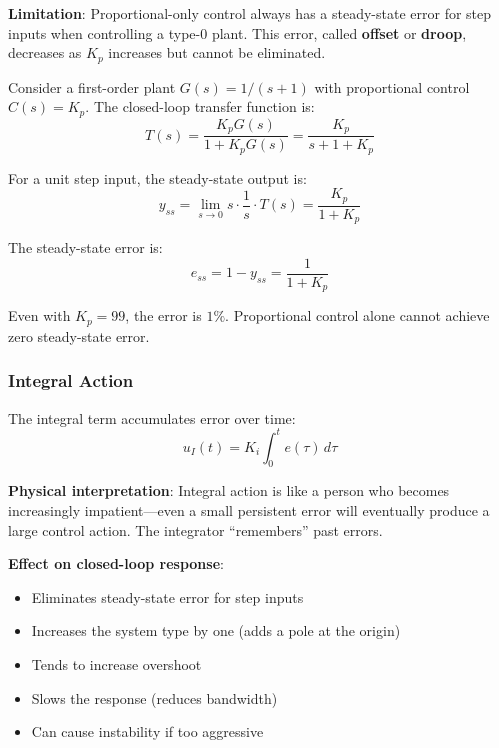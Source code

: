 \textbf{Limitation}: Proportional-only control always has a steady-state error for step inputs when controlling a type-0 plant. This error, called \textbf{offset} or \textbf{droop}, decreases as $K_p$ increases but cannot be eliminated.

\begin{example}
\label{ex:p_control_offset}
Consider a first-order plant $G(s) = 1/(s+1)$ with proportional control $C(s) = K_p$. The closed-loop transfer function is:
\begin{equation}
T(s) = \frac{K_p G(s)}{1 + K_p G(s)} = \frac{K_p}{s + 1 + K_p}
\end{equation}

For a unit step input, the steady-state output is:
\begin{equation}
y_{ss} = \lim_{s \to 0} s \cdot \frac{1}{s} \cdot T(s) = \frac{K_p}{1 + K_p}
\end{equation}

The steady-state error is:
\begin{equation}
e_{ss} = 1 - y_{ss} = \frac{1}{1 + K_p}
\end{equation}

Even with $K_p = 99$, the error is $1\%$. Proportional control alone cannot achieve zero steady-state error.
\end{example}

\subsubsection{Integral Action}

The integral term accumulates error over time:
\begin{equation}
u_I(t) = K_i \int_0^t e(\tau) \, d\tau
\end{equation}

\textbf{Physical interpretation}: Integral action is like a person who becomes increasingly impatient---even a small persistent error will eventually produce a large control action. The integrator ``remembers'' past errors.

\textbf{Effect on closed-loop response}:
\begin{itemize}
    \item Eliminates steady-state error for step inputs
    \item Increases the system type by one (adds a pole at the origin)
    \item Tends to increase overshoot
    \item Slows the response (reduces bandwidth)
    \item Can cause instability if too aggressive
\end{itemize}

